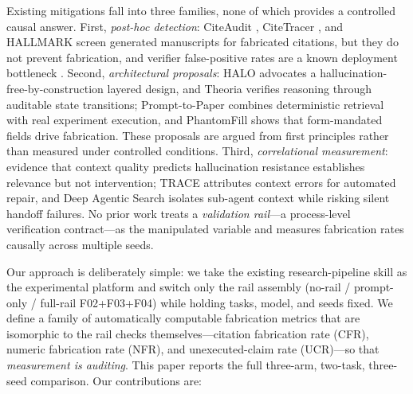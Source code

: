 \documentclass[10pt,twocolumn]{article}
\begin{document}
Existing mitigations fall into three families, none of which provides a controlled causal answer. First, \emph{post-hoc detection}: CiteAudit \citep{shi2026citeaudit}, CiteTracer \citep{li2026citetracer}, and HALLMARK \citep{reizinger2026hallmark} screen generated manuscripts for fabricated citations, but they do not prevent fabrication, and verifier false-positive rates are a known deployment bottleneck \citep{banerjee2026failuremodes}. Second, \emph{architectural proposals}: HALO \citep{raduta2026halo} advocates a hallucination-free-by-construction layered design, and Theoria \citep{saldivar2026theoria} verifies reasoning through auditable state transitions; Prompt-to-Paper \citep{kamran2026prompttopaper} combines deterministic retrieval with real experiment execution, and PhantomFill \citep{usman2026phantomfill} shows that form-mandated fields drive fabrication. These proposals are argued from first principles rather than measured under controlled conditions. Third, \emph{correlational measurement}: evidence that context quality predicts hallucination resistance \citep{bousetouane2026context} establishes relevance but not intervention; TRACE \citep{zhao2026trace} attributes context errors for automated repair, and Deep Agentic Search \citep{rafieioskooei2026deepagentic} isolates sub-agent context while risking silent handoff failures. No prior work treats a \emph{validation rail}---a process-level verification contract---as the manipulated variable and measures fabrication rates causally across multiple seeds.

Our approach is deliberately simple: we take the existing research-pipeline skill as the experimental platform and switch only the rail assembly (no-rail / prompt-only / full-rail F02+F03+F04) while holding tasks, model, and seeds fixed. We define a family of automatically computable fabrication metrics that are isomorphic to the rail checks themselves---citation fabrication rate (CFR), numeric fabrication rate (NFR), and unexecuted-claim rate (UCR)---so that \emph{measurement is auditing}. This paper reports the full three-arm, two-task, three-seed comparison. Our contributions are:
\end{document}
